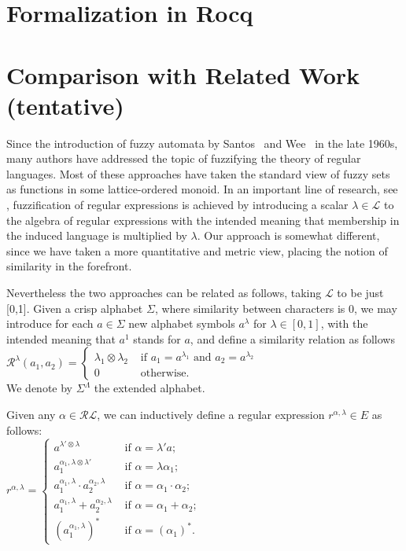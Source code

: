 \documentclass{article}
\begin{document}
\section{Formalization in Rocq}
\section{Comparison with Related Work (tentative)}
Since the introduction of fuzzy automata by Santos~\cite{Santos68} and Wee~\cite{Wee67,WeeFu69} in the late 1960s, many authors have addressed the topic of fuzzifying the theory of regular languages. Most of these approaches have taken the standard view of fuzzy sets as functions in some lattice-ordered monoid. In an important line of research, see \cite{LP06,SC12,GJT17}, fuzzification of regular expressions is achieved by introducing a scalar $\lambda\in \mathcal L$ to the algebra of regular expressions with the intended meaning that membership in the induced language is multiplied by $\lambda$. Our approach is somewhat different, since we have taken a more quantitative and metric view, placing the notion of similarity in the forefront.

Nevertheless the two approaches can be related as follows, taking $\mathcal L$ to be just [0,1]. Given a crisp alphabet $\Sigma$, where similarity between characters is 0, we may introduce for each $a\in \Sigma$ new alphabet symbols $a^\lambda$ for $\lambda\in [0,1]$, with the intended meaning that $a^1$ stands for $a$, and define a similarity relation as follows\\
$\mathcal R^\lambda(a_1,a_2)=\begin{cases} \lambda_1 \otimes \lambda_2& \mbox{ if } a_1=a^{\lambda_1} \mbox{ and } a_2=a^{\lambda_2} \\
                                                           0 & \mbox{ otherwise.}
\end{cases}$\\ We denote by $\Sigma^\Lambda$ the extended alphabet.

Given any $\alpha \in \mathcal R \mathcal L$, we can inductively define a regular expression $r^{\alpha,\lambda}\in E$ as follows:\\
$r^{\alpha,\lambda}=\begin{cases} a^{\lambda'\otimes \lambda} & \mbox{ if } \alpha=\lambda' a;\\
 a_1^{\alpha_1,\lambda\otimes \lambda'} & \mbox{ if } \alpha=\lambda \alpha_1;\\
 a_1^{\alpha_1,\lambda}\cdot a_2^{\alpha_2,\lambda} & \mbox{ if } \alpha=\alpha_1 \cdot \alpha_2;\\
 a_1^{\alpha_1,\lambda}+ a_2^{\alpha_2,\lambda} & \mbox{ if } \alpha=\alpha_1 + \alpha_2;\\
 (a_1^{\alpha_1,\lambda})^* & \mbox{ if } \alpha= ( \alpha_1)^*.
\end{cases}$
\end{document}

